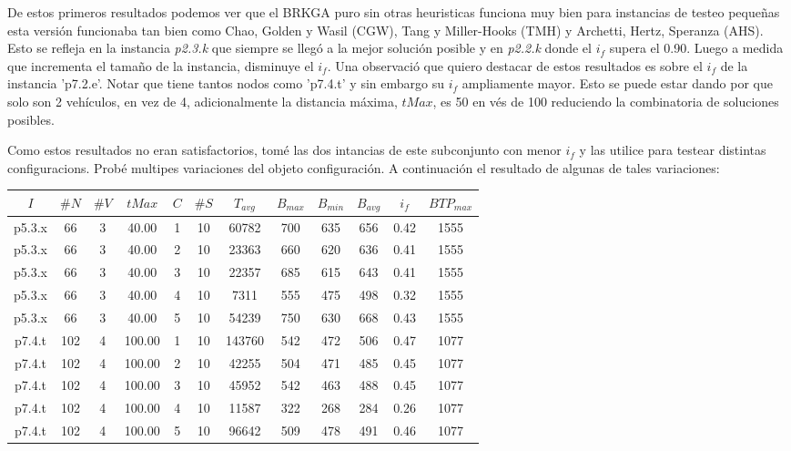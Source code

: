 \bigskip

De estos primeros resultados podemos ver que el BRKGA puro sin otras heuristicas funciona muy bien para instancias de testeo pequeñas esta versión funcionaba tan bien como Chao, Golden y Wasil (CGW), Tang y Miller-Hooks (TMH) y Archetti, Hertz, Speranza (AHS). Esto se refleja en la instancia \textit{p2.3.k} que siempre se llegó a la mejor solución posible y en \textit{p2.2.k} donde el $i_f$ supera el 0.90. Luego a medida que incrementa el tamaño de la instancia, disminuye el $i_f$. Una observació que quiero destacar de estos resultados es sobre el $i_f$ de la instancia 'p7.2.e'. Notar que tiene tantos nodos como 'p7.4.t' y sin embargo su $i_f$ ampliamente mayor. Esto se puede estar dando por que solo son 2 vehículos, en vez de 4, adicionalmente la distancia máxima, $tMax$, es 50 en vés de 100 reduciendo la combinatoria de soluciones posibles.


\bigskip

Como estos resultados no eran satisfactorios, tomé las dos intancias de este subconjunto con menor $i_{f}$ y las utilice para testear distintas configuracions. Probé multipes variaciones del objeto configuración. A continuación el resultado de algunas de tales variaciones:

\bigskip


\begin{center}
\begin{tabular}{ |c|c|c|c|c|c|c|c|c|c|c|c| } 
 \hline
$I$ & $\#N$ & $\#V$ & $tMax$ & $C$ & $\#S$ & $T_{avg}$ & $B_{max}$ & $B_{min}$ & $B_{avg}$ & $i_{f}$ & $BTP_{max}$ \\
\hline
p5.3.x & 66 & 3 & 40.00 & 1 & 10 & 60782 & 700 & 635 & 656 & 0.42 & 1555  \\
p5.3.x & 66 & 3 & 40.00 & 2 & 10 & 23363 & 660 & 620 & 636 & 0.41 & 1555  \\
p5.3.x & 66 & 3 & 40.00 & 3 & 10 & 22357 & 685 & 615 & 643 & 0.41 & 1555  \\
p5.3.x & 66 & 3 & 40.00 & 4 & 10 & 7311 & 555 & 475 & 498 & 0.32 & 1555  \\
p5.3.x & 66 & 3 & 40.00 & 5 & 10 & 54239 & 750 & 630 & 668 & 0.43 & 1555  \\
p7.4.t & 102 & 4 & 100.00 & 1 & 10 & 143760 & 542 & 472 & 506 & 0.47 & 1077  \\
p7.4.t & 102 & 4 & 100.00 & 2 & 10 & 42255 & 504 & 471 & 485 & 0.45 & 1077  \\
p7.4.t & 102 & 4 & 100.00 & 3 & 10 & 45952 & 542 & 463 & 488 & 0.45 & 1077  \\
p7.4.t & 102 & 4 & 100.00 & 4 & 10 & 11587 & 322 & 268 & 284 & 0.26 & 1077  \\
p7.4.t & 102 & 4 & 100.00 & 5 & 10 & 96642 & 509 & 478 & 491 & 0.46 & 1077  \\
\hline
\end{tabular}
\end{center}

